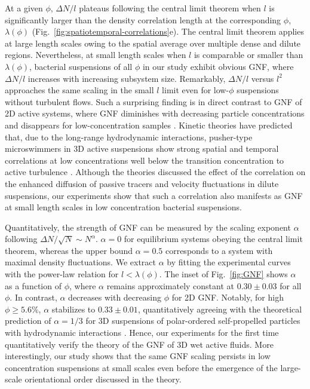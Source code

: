 \documentclass[twocolumn,aps,prx,amsmath,amssymb,longbibliography]{revtex4-2}
\begin{document}
At a given $\phi$, $\Delta N/l$ plateaus following the central limit theorem when $l$ is significantly larger than the density correlation length at the corresponding $\phi$, $\lambda(\phi)$ (Fig.~\ref{fig:spatiotemporal-correlations}e). The central limit theorem applies at large length scales owing to the spatial average over multiple dense and dilute regions. Nevertheless, at small length scales when $l$ is comparable or smaller than $\lambda(\phi)$, bacterial suspensions of all $\phi$ in our study exhibit obvious GNF, where $\Delta N/l$ increases with increasing subsystem size. Remarkably, $\Delta N/l$ versus $l^2$ approaches the same scaling in the small $l$ limit even for low-$\phi$ suspensions without turbulent flows. Such a surprising finding is in direct contrast to GNF of 2D active systems, where GNF diminishes with decreasing particle concentrations and disappears for low-concentration samples \cite{Narayan2007,Aranson2008,Kudrolli2008,Deseigne2010,Zhang2010,Schaller2013}. Kinetic theories have predicted that, due to the long-range hydrodynamic interactions, pusher-type microswimmers in 3D active suspensions show strong spatial and temporal correlations at low concentrations well below the transition concentration to active turbulence \cite{Stenhammar2017,Nambiar2021}. Although the theories discussed the effect of the correlation on the enhanced diffusion of passive tracers and velocity fluctuations in dilute suspensions, our experiments show that such a correlation also manifests as GNF at small length scales in low concentration bacterial suspensions.


Quantitatively, the strength of GNF can be measured by the scaling exponent $\alpha$ following $\Delta N/\sqrt{N} \sim N^\alpha$. $\alpha=0$ for equilibrium systems obeying the central limit theorem, whereas the upper bound $\alpha = 0.5$ corresponds to a system with maximal density fluctuations.
We extract $\alpha$ by fitting the experimental curves with the power-law relation for $l < \lambda(\phi)$. The inset of Fig.~\ref{fig:GNF} shows $\alpha$ as a function of $\phi$, where $\alpha$ remains approximately constant at $0.30 \pm 0.03$ for all $\phi$. In contrast, $\alpha$ decreases with decreasing $\phi$ for 2D GNF. Notably, for high $\phi \geq 5.6\%$, $\alpha$ stabilizes to $0.33 \pm 0.01$, quantitatively agreeing with the theoretical prediction of $\alpha = 1/3$ for 3D suspensions of polar-ordered self-propelled particles with hydrodynamic interactions \cite{AditiSimha2002}. Hence, our experiments for the first time quantitatively verify the theory of the GNF of 3D wet active fluids. More interestingly, our study shows that the same GNF scaling persists in low concentration suspensions at small scales even before the emergence of the large-scale orientational order discussed in the theory.
\end{document}
